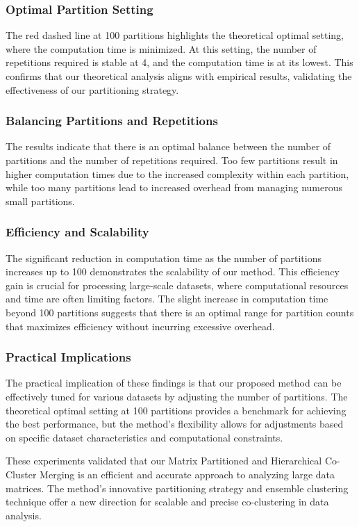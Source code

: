 \documentclass[journal]{IEEEtran}
\begin{document}
\subsubsection{Optimal Partition Setting}
The red dashed line at 100 partitions highlights the theoretical optimal setting, where the computation time is minimized. At this setting, the number of repetitions required is stable at 4, and the computation time is at its lowest. This confirms that our theoretical analysis aligns with empirical results, validating the effectiveness of our partitioning strategy.

\subsubsection{Balancing Partitions and Repetitions}
The results indicate that there is an optimal balance between the number of partitions and the number of repetitions required. Too few partitions result in higher computation times due to the increased complexity within each partition, while too many partitions lead to increased overhead from managing numerous small partitions.

\subsubsection{Efficiency and Scalability}
The significant reduction in computation time as the number of partitions increases up to 100 demonstrates the scalability of our method. This efficiency gain is crucial for processing large-scale datasets, where computational resources and time are often limiting factors. The slight increase in computation time beyond 100 partitions suggests that there is an optimal range for partition counts that maximizes efficiency without incurring excessive overhead.

\subsubsection{Practical Implications}
The practical implication of these findings is that our proposed method can be effectively tuned for various datasets by adjusting the number of partitions. The theoretical optimal setting at 100 partitions provides a benchmark for achieving the best performance, but the method's flexibility allows for adjustments based on specific dataset characteristics and computational constraints.

These experiments validated that our Matrix Partitioned and Hierarchical Co-Cluster Merging is an efficient and accurate approach to analyzing large data matrices. The method's innovative partitioning strategy and ensemble clustering technique offer a new direction for scalable and precise co-clustering in data analysis.
\end{document}
